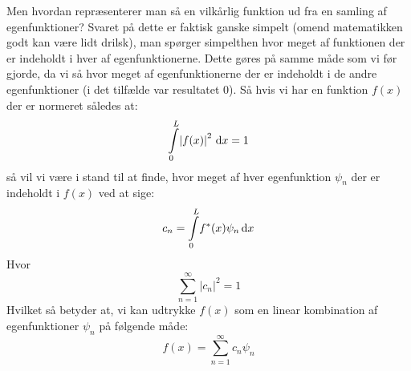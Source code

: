 \documentclass[../Kvantemekanik.tex]{subfiles}
\begin{document}
Men hvordan repræsenterer man så en vilkårlig funktion ud fra en samling af egenfunktioner? Svaret på dette er faktisk ganske simpelt (omend matematikken godt kan være lidt drilsk), man spørger simpelthen hvor meget af funktionen der er indeholdt i hver af egenfunktionerne. Dette gøres på samme måde som vi før gjorde, da vi så hvor meget af egenfunktionerne der er indeholdt i de andre egenfunktioner (i det tilfælde var resultatet 0). Så hvis vi har en funktion $f(x)$ der er normeret således at:
\begin{equation*}
    \integral{\abs{f(x)}^2}{x}{0}{L} = 1
\end{equation*}
så vil vi være i stand til at finde, hvor meget af hver egenfunktion $\psi_n$ der er indeholdt i $f(x)$ ved at sige:
\begin{equation}
c_n 
= \integral{f^*(x)\psi_n}{x}{0}{L}
\label{kvant:eq:proj}
\end{equation}
Hvor
\begin{equation*}
    \sum_{n=1}^{\infty}|c_n|^2=1
\end{equation*}
Hvilket så betyder at, vi kan udtrykke $f(x)$ som en linear kombination af egenfunktioner $\psi_n$ på følgende måde:
\begin{equation}
    f(x)=\sum_{n=1}^{\infty}c_{n}\psi_{n}
\end{equation}
\end{document}
